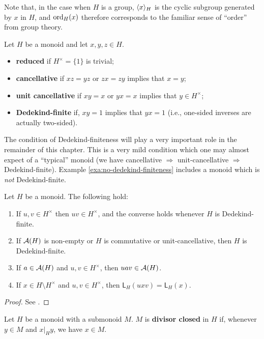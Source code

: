 Note that, in the case when $H$ is a group, $\langle x \rangle_H$ is the cyclic subgroup generated by $x$ in $H$, and ${\operatorname{ord}}_H(x)$ therefore corresponds to the familiar sense of ``order'' from group theory.


\begin{defn} \label{def:monoid properties}
	Let $H$ be a monoid and let $x,y,z\in H$.  
	\begin{itemize}
		\item \textbf{reduced} if $H^\times = \{1\}$ is trivial;
		\item \textbf{cancellative} if $xz = yz$ or $zx=zy$ implies that $x=y$;
		\item \textbf{unit cancellative} if $xy=x$ or $yx=x$ implies that $y\in H^\times$;
		\item \textbf{Dedekind-finite} if, $xy=1$ implies that $yx=1$ (i.e., one-sided inverses are actually two-sided).
	\end{itemize}
\end{defn}
The condition of Dedekind-finiteness will play a very important role in the remainder of this chapter. 
This is a very mild condition which one may almost expect of a ``typical'' monoid (we have cancellative $\Rightarrow$ unit-cancellative $\Rightarrow$ Dedekind-finite).
Example \ref{exa:no-dedekind-finiteness} includes a monoid which is \textit{not} Dedekind-finite.


\begin{prop}\label{prop:unit-adjust}
	Let $H$ be a monoid.
	The following hold:
	\begin{enumerate}[label={\rm (\roman{*})}]
		\item\label{it:prop:unit-adjust(0)} If $u, v \in H^\times$ then $uv \in H^\times$, and the converse holds whenever $H$ is Dedekind-finite.
		\item\label{it:prop:unit-adjust(0b)} If $\mathcal{A}(H)$ is non-empty or $H$ is commutative or unit-cancellative, then $H$ is Dedekind-finite.
		\item\label{it:prop:unit-adjust(i)} If $a\in \mathcal{A}(H)$ and $u, v \in H^\times$, then $uav\in \mathcal{A}(H)$.
		\item\label{it:prop:unit-adjust(ii)} If $x\in H\setminus H^\times$ and $u, v \in H^\times$, then $\mathsf{L}_H(uxv) = \mathsf{L}_H(x)$.
	\end{enumerate}
\end{prop}
%
\begin{proof}
	See \cite[parts (i), (ii), and (iv) of Lemma 2.2, and Proposition 2.30]{fan-tringali18}.
\end{proof}
%
%
\begin{defn} \label{def:divisor closed}
	Let $H$ be a monoid with a submonoid $M$.
	$M$ is \textbf{divisor closed} in $H$ if, whenever $y\in M$ and $x|_H y$, we have $x\in M$.
\end{defn}


